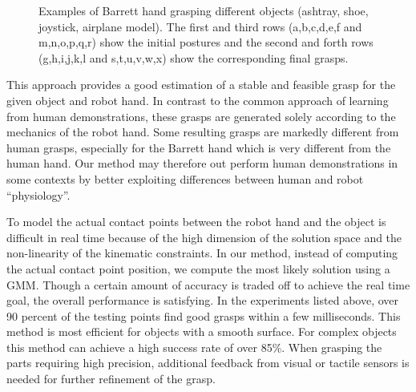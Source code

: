 \begin{figure}

  \caption{\scriptsize{Examples of Barrett hand grasping different objects (ashtray, shoe, joystick, airplane model). The first and third rows (a,b,c,d,e,f and m,n,o,p,q,r) show the initial postures and the second and forth rows (g,h,i,j,k,l and s,t,u,v,w,x) show the corresponding final grasps.}
}
    \label{barrett2}
\end{figure}



This approach provides a good estimation of a stable and feasible grasp for the given object and robot hand. In contrast to the common approach of learning from human demonstrations, these grasps are generated solely according to the mechanics of the robot hand. Some resulting grasps are markedly different from  human grasps, especially for the Barrett hand which is very different from the human hand. Our method may therefore out perform human demonstrations in some contexts by better exploiting differences between human and robot ``physiology''.

To model the actual contact points between the robot hand and the object is difficult in real time because of the high dimension of the solution space and the non-linearity of the kinematic constraints. In our method, instead of computing the actual contact point position, we compute the most likely solution using a GMM. Though a certain amount of accuracy is traded off to achieve the real time goal, the overall performance is satisfying. In the experiments listed above, over 90 percent of the testing points find good grasps within a few milliseconds. This method is most efficient for objects with a smooth surface. For complex objects this method can achieve a high success rate of over 85\%. When grasping the parts requiring high precision, additional feedback from visual or tactile sensors is needed for further refinement of the grasp.

